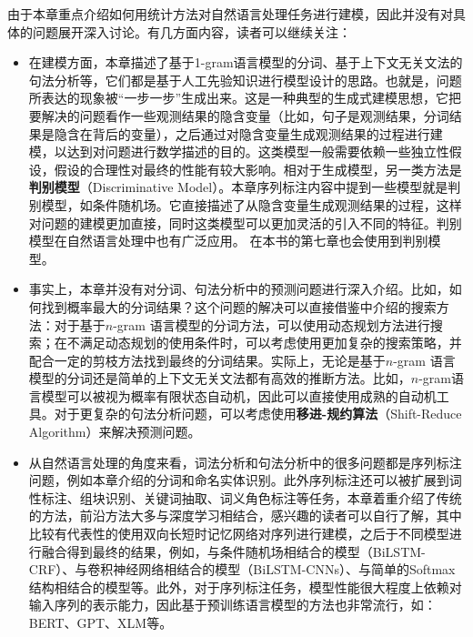 \parinterval 由于本章重点介绍如何用统计方法对自然语言处理任务进行建模，因此并没有对具体的问题展开深入讨论。有几方面内容，读者可以继续关注：

\begin{itemize}
\vspace{0.5em}
\item 在建模方面，本章描述了基于1-gram语言模型的分词、基于上下文无关文法的句法分析等，它们都是基于人工先验知识进行模型设计的思路。也就是，问题所表达的现象被“一步一步”生成出来。这是一种典型的生成式建模思想，它把要解决的问题看作一些观测结果的隐含变量（比如，句子是观测结果，分词结果是隐含在背后的变量），之后通过对隐含变量生成观测结果的过程进行建模，以达到对问题进行数学描述的目的。这类模型一般需要依赖一些独立性假设，假设的合理性对最终的性能有较大影响。相对于生成模型，另一类方法是{\small\sffamily\bfseries{判别模型}}（Discriminative Model）。本章序列标注内容中提到一些模型就是判别模型，如条件随机场。它直接描述了从隐含变量生成观测结果的过程，这样对问题的建模更加直接，同时这类模型可以更加灵活的引入不同的特征。判别模型在自然语言处理中也有广泛应用。 在本书的第七章也会使用到判别模型。
\vspace{0.5em}
\item 事实上，本章并没有对分词、句法分析中的预测问题进行深入介绍。比如，如何找到概率最大的分词结果？这个问题的解决可以直接借鉴{\chaptertwo}中介绍的搜索方法：对于基于$n$-­gram 语言模型的分词方法，可以使用动态规划方法进行搜索；在不满足动态规划的使用条件时，可以考虑使用更加复杂的搜索策略，并配合一定的剪枝方法找到最终的分词结果。实际上，无论是基于$n$-gram 语言模型的分词还是简单的上下文无关文法都有高效的推断方法。比如，$n$-gram语言模型可以被视为概率有限状态自动机，因此可以直接使用成熟的自动机工具。对于更复杂的句法分析问题，可以考虑使用{\small\sffamily\bfseries{移进-规约算法}}（Shift-Reduce Algorithm）来解决预测问题。
\vspace{0.5em}
\item 从自然语言处理的角度来看，词法分析和句法分析中的很多问题都是序列标注问题，例如本章介绍的分词和命名实体识别。此外序列标注还可以被扩展到词性标注、组块识别、关键词抽取、词义角色标注等任务，本章着重介绍了传统的方法，前沿方法大多与深度学习相结合，感兴趣的读者可以自行了解，其中比较有代表性的使用双向长短时记忆网络对序列进行建模，之后于不同模型进行融合得到最终的结果，例如，与条件随机场相结合的模型（BiLSTM-CRF）、与卷积神经网络相结合的模型（BiLSTM-CNNs）、与简单的Softmax结构相结合的模型等。此外，对于序列标注任务，模型性能很大程度上依赖对输入序列的表示能力，因此基于预训练语言模型的方法也非常流行，如：BERT、GPT、XLM等。
\vspace{0.5em}
\end{itemize}
